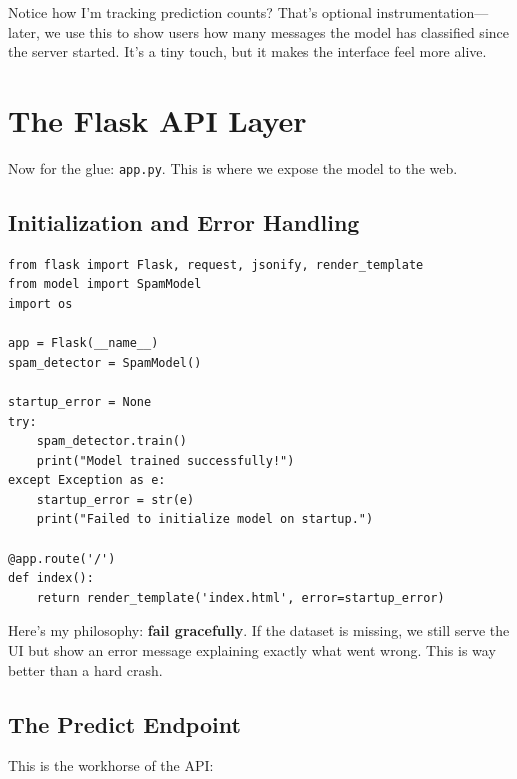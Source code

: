 \documentclass[12pt, a4paper]{article}
\begin{document}
\begin{devnote}
Notice how I'm tracking prediction counts? That's optional instrumentation---later, we use this to show users how many messages the model has classified since the server started. It's a tiny touch, but it makes the interface feel more alive.
\end{devnote}

\section{The Flask API Layer}

Now for the glue: \texttt{app.py}. This is where we expose the model to the web.

\subsection{Initialization and Error Handling}

\begin{verbatim}
from flask import Flask, request, jsonify, render_template
from model import SpamModel
import os

app = Flask(__name__)
spam_detector = SpamModel()

startup_error = None
try:
    spam_detector.train()
    print("Model trained successfully!")
except Exception as e:
    startup_error = str(e)
    print("Failed to initialize model on startup.")

@app.route('/')
def index():
    return render_template('index.html', error=startup_error)
\end{verbatim}

Here's my philosophy: \textbf{fail gracefully}. If the dataset is missing, we still serve the UI but show an error message explaining exactly what went wrong. This is way better than a hard crash.

\subsection{The Predict Endpoint}

This is the workhorse of the API:
\end{document}
